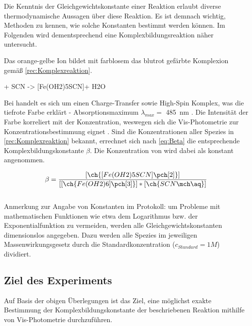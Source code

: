 \documentclass{article}
\begin{document}
      Die Kenntnis der Gleichgewichtskonstante einer Reaktion erlaubt diverse thermodynamische Aussagen über diese Reaktion. Es ist demnach wichtig, Methoden zu kennen, wie solche Konstanten bestimmt werden können. Im Folgenden wird dementsprechend eine Komplexbildungsreaktion näher untersucht.
      
      Das orange-gelbe  Ion bildet mit farblosem  das blutrot gefärbte Komplexion \ch{[Fe(OH2)5SCN]\pch[2]} gemäß \ref{rec:Komplexreaktion}. 

      \begin{reaction}
        [Fe(OH2)6]\pch[3] + SCN\mch\aq{} -> [Fe(OH2)5SCN]\pch[2] + H2O \label{rec:Komplexreaktion} \\
      \end{reaction}
      
      Bei \ch{[Fe(OH2)5SCN]\pch[2]} handelt es sich um einen Charge-Transfer sowie High-Spin Komplex, was die tiefrote Farbe erklärt - Absorptionsmaximum $\lambda _{max} = $ \SI[mode=text]{485}{\nano\meter} \cite[S. 540]{InorganicChemistry}. Die Intensität der Farbe korreliert mit der Konzentration, weswegen sich die Vis-Photometrie zur Konzentrationsbestimmung eignet \cite[S. 108]{TaschenatlasAnallytik}. Sind die Konzentrationen aller Spezies in \ref{rec:Komplexreaktion} bekannt, errechnet sich nach \eqref{eq:Beta} die entsprechende Komplexbildungskonstante $\beta$. Die Konzentration von  wird dabei als konstant angenommen.
      
      \begin{equation}
        \beta = \frac{[\ch{[Fe(OH2)5SCN]\pch[2]}]}{[[\ch{Fe(OH2)6]\pch[3]}] * [\ch{SCN\mch\aq}]} \label{eq:Beta}
      \end{equation} \\
      
      Anmerkung zur Angabe von Konstanten im Protokoll: um Probleme mit mathematischen Funktionen wie etwa dem Logarithmus bzw. der Exponentialfunktion zu vermeiden, werden alle Gleichgewichtskonstanten dimensionslos angegeben. Dazu werden alle Spezies im jeweiligen Massenwirkungsgesetz durch die Standardkonzentration ($c_{Standard} = 1 M$) dividiert.
      
    \subsection{Ziel des Experiments}
    
    Auf Basis der obigen Überlegungen ist das Ziel, eine möglichst exakte Bestimmung der Komplexbildungskonstante der beschriebenen Reaktion mithilfe von Vis-Photometrie durchzuführen. 
  
\end{document}
